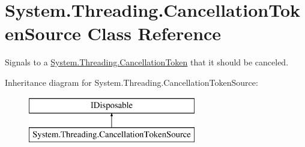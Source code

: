 \hypertarget{class_system_1_1_threading_1_1_cancellation_token_source}{}\section{System.\+Threading.\+Cancellation\+Token\+Source Class Reference}
\label{class_system_1_1_threading_1_1_cancellation_token_source}


Signals to a \hyperlink{struct_system_1_1_threading_1_1_cancellation_token}{System.\+Threading.\+Cancellation\+Token} that it should be canceled.  


Inheritance diagram for System.\+Threading.\+Cancellation\+Token\+Source\+:\begin{figure}[H]
\begin{center}
\leavevmode
\includegraphics[height=2.000000cm]{class_system_1_1_threading_1_1_cancellation_token_source}
\end{center}
\end{figure}
